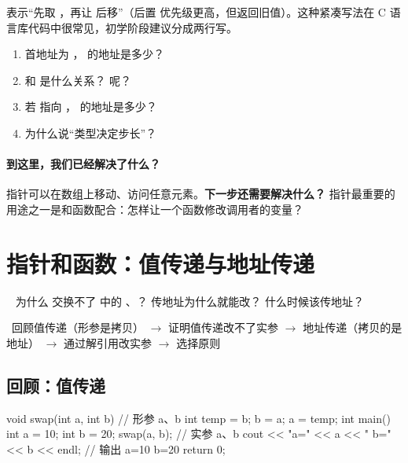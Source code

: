 \begin{extendbox}
 表示“先取 ，再让  后移”（后置 \cc{++} 优先级更高，但返回旧值）。这种紧凑写法在 C 语言库代码中很常见，初学阶段建议分成两行写。
\end{extendbox}

\begin{checkbox}
\begin{enumerate}[label=\arabic*.,itemsep=0pt]
  \item {} 首地址为 ， 的地址是多少？
  \item {} 和  是什么关系？ 呢？
  \item 若  指向 ， 的地址是多少？
  \item 为什么说“类型决定步长”？
\end{enumerate}
\end{checkbox}

\paragraph{到这里，我们已经解决了什么？} 指针可以在数组上移动、访问任意元素。\textbf{下一步还需要解决什么？} 指针最重要的用途之一是和函数配合：怎样让一个函数修改调用者的变量？

\section{指针和函数：值传递与地址传递}\label{sec:func}
\  为什么  交换不了  中的 、？ 传地址为什么就能改？ 什么时候该传地址？\par
{}\ 回顾值传递（形参是拷贝） $\to$ 证明值传递改不了实参 $\to$ 地址传递（拷贝的是地址） $\to$ 通过解引用改实参 $\to$ 选择原则

\subsection{回顾：值传递}
\begin{examplebox}
\begin{code}
void swap(int a, int b)       // 形参 a、b
{
    int temp = b;
    b = a;
    a = temp;
}
int main()
{
    int a = 10;
    int b = 20;
    swap(a, b);               // 实参 a、b
    cout << "a=" << a << " b=" << b << endl;   // 输出 a=10 b=20
    return 0;
}
\end{code}
\end{examplebox}

